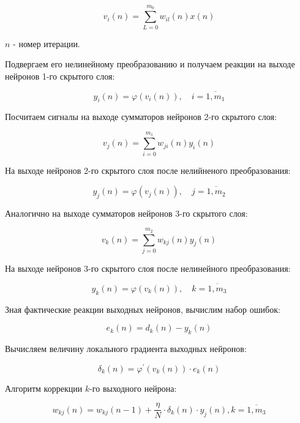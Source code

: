 \documentclass{article}
\begin{document}
\begin{equation}
    v_i (n) = \sum_{L=0}^{m_{0}} w_{il}(n) x(n)
\end{equation}

\noindent
$n$ - номер итерации.

Подвергаем его нелинейному преобразованию и получаем реакции на выходе нейронов 1-го скрытого слоя:

\begin{equation}
    y_i(n) = \varphi (v_i(n)), \quad i=\overline{1,m_1}
\end{equation}

Посчитаем сигналы на выходе сумматоров нейронов 2-го скрытого слоя:

\begin{equation}
    v_j (n) = \sum_{i=0}^{m_{1}} w_{ji}(n) y_i(n)
\end{equation}

На выходе нейронов 2-го скрытого слоя после нелийненого преобразования:

\begin{equation}
    y_j(n) = \varphi (v_j(n)), \quad j=\overline{1,m_2}
\end{equation}

Аналогично на выходе сумматоров нейронов 3-го скрытого слоя:

\begin{equation}
    v_k (n) = \sum_{j=0}^{m_{2}} w_{kj}(n) y_j(n)
\end{equation}

На выходе нейронов 3-го скрытого слоя после нелинейного преобразования:

\begin{equation}
    y_k(n) = \varphi (v_k(n)), \quad k=\overline{1,m_3}
\end{equation}

Зная фактические реакции выходных нейронов, вычислим набор ошибок:

\begin{equation}
    e_{k}(n) = d_k(n) - y_k(n)
\end{equation}

Вычисляем величину локального градиента выходных нейронов:

\begin{equation}
    \delta_k(n) = \varphi^{\prime}(v_k(n))\cdot e_k(n)
\end{equation}

Алгоритм коррекции $k$-го выходного нейрона:

\begin{equation}
    w_{kj}(n) = w_{kj}(n-1) + \dfrac{\eta}{N} \cdot \delta_{k}(n) \cdot y_j(n), k=\overline{1,m_3}
\end{equation}
\end{document}
